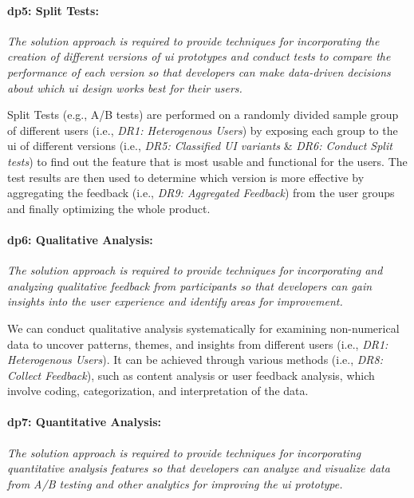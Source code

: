 \paragraph{\ac{dp}5: Split Tests:} \textit{The solution approach is required to provide techniques for incorporating the creation of different versions of \ac{ui} prototypes and conduct tests to compare the performance of each version so that developers can make data-driven decisions about which \ac{ui} design works best for their users.}

Split Tests (e.g., A/B tests) are performed on a randomly divided sample group of different users (i.e., \textit{DR1: Heterogenous Users}) by exposing each group to the \ac{ui} of different versions (i.e., \textit{DR5: Classified UI variants} \& \textit{DR6: Conduct Split tests}) to find out the feature that is most usable and functional for the users.
The test results are then used to determine which version is more effective by aggregating the feedback (i.e., \textit{DR9: Aggregated Feedback}) from the user groups and finally optimizing the whole product.


\paragraph{\ac{dp}6: Qualitative Analysis:} \textit{The solution approach is required to provide techniques for incorporating and analyzing qualitative feedback from participants so that developers can gain insights into the user experience and identify areas for improvement.}

We can conduct qualitative analysis systematically for examining non-numerical data to uncover patterns, themes, and insights from different users (i.e., \textit{DR1: Heterogenous Users}). 
It can be achieved through various methods (i.e., \textit{DR8: Collect Feedback}), such as content analysis or user feedback analysis, which involve coding, categorization, and interpretation of the data.

\paragraph{\ac{dp}7: Quantitative Analysis:} \textit{The solution approach is required to provide techniques for incorporating quantitative analysis features so that developers can analyze and visualize data from A/B testing and other analytics for improving the \ac{ui} prototype.}

